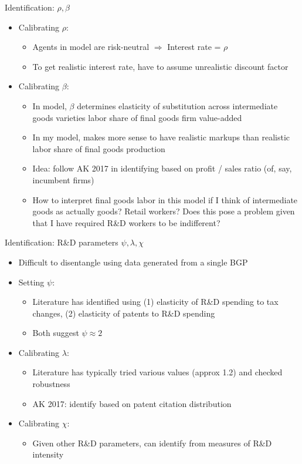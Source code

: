 \documentclass[english,usenames,dvipsnames]{beamer}
\begin{document}
\begin{frame}{Identification: $\rho, \beta$}
\begin{itemize}
	\item Calibrating $\rho$:
	\begin{itemize}
		\item Agents in model are risk-neutral $\Rightarrow$ Interest rate = $\rho$
		\item To get realistic interest rate, have to assume unrealistic discount factor
	\end{itemize}
	\item Calibrating $\beta$:
	\begin{itemize}
		\item In model, $\beta$ determines elasticity of substitution across intermediate goods varieties labor share of final goods firm value-added
		\item In my model, makes more sense to have realistic markups than realistic labor share of final goods production
		\item Idea: follow AK 2017 in identifying based on profit / sales ratio (of, say, incumbent firms)
		\item How to interpret final goods labor in this model if I think of intermediate goods as actually goods? Retail workers? Does this pose a problem given that I have required R\&D workers to be indifferent? 
	\end{itemize}
\end{itemize}
\end{frame}

\begin{frame}{Identification: R\&D parameters $\psi, \lambda, \chi$}
\begin{itemize}
\item Difficult to disentangle using data generated from a single BGP 
\item Setting $\psi$:
\begin{itemize}
	\item Literature has identified using (1) elasticity of R\&D spending to tax changes, (2) elasticity of patents to R\&D spending
	\item Both suggest $\psi \approx 2$
\end{itemize}
\item Calibrating $\lambda$:
\begin{itemize}
	\item Literature has typically tried various values (approx 1.2) and checked robustness
	\item AK 2017: identify based on patent citation distribution
\end{itemize}
\item Calibrating $\chi$:
\begin{itemize}
	\item Given other R\&D parameters, can identify from measures of R\&D intensity  
\end{itemize}
\end{itemize}
\end{frame}
\end{document}
